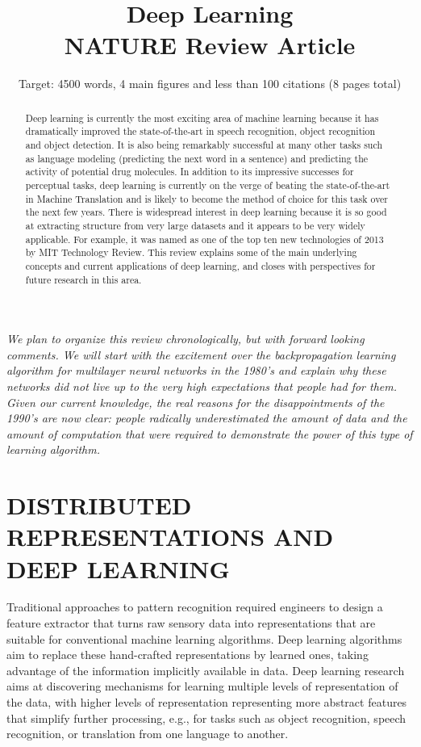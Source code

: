 \documentclass[11pt]{article} %
\title{Deep Learning \\ NATURE Review Article}
\author{Target: 4500 words, 4 main figures and less than 100 citations (8 pages total)}
\begin{document}
\maketitle

\begin{abstract}
Deep learning is currently the most exciting area of machine learning
because it has dramatically improved the state-of-the-art in speech
recognition, object recognition and object detection.  It is also being
remarkably successful at many other tasks such as language modeling
(predicting the next word in a sentence) and predicting the activity of
potential drug molecules.  In addition to its impressive successes for
perceptual tasks, deep learning is currently on the verge of beating the
state-of-the-art in Machine Translation and is likely to become the method
of choice for this task over the next few years.
There is widespread interest in deep learning because it is so good at
extracting structure from very large datasets and it appears to be very
widely applicable. For example, it was named as one of the top ten new
technologies of 2013 by MIT Technology Review. This review explains some
of the main underlying concepts and current applications of deep learning,
and closes with perspectives for future research in this area.
\end{abstract}

{\em 
We plan to organize this review chronologically, but with forward looking
 comments. We will start with the excitement over the backpropagation
 learning algorithm for multilayer neural networks in the 1980's and
 explain why these networks did not live up to the very high expectations
 that people had for them.  Given our current knowledge, the real reasons
 for the disappointments of the 1990's are now clear: people radically
 underestimated the amount of data and the amount of computation that were
 required to demonstrate the power of this type of learning algorithm.
}

\section{DISTRIBUTED REPRESENTATIONS AND DEEP LEARNING}

Traditional approaches to pattern recognition required engineers to design
a feature extractor that turns raw sensory data into representations that
are suitable for conventional machine learning algorithms. Deep learning
algorithms aim to replace these hand-crafted representations by learned
ones, taking advantage of the information implicitly available in
data. Deep learning research aims at discovering mechanisms for learning
multiple levels of representation of the data, with higher levels of
representation representing more abstract features that simplify further
processing, e.g., for tasks such as object recognition, speech recognition,
or translation from one language to another.
\end{document}
